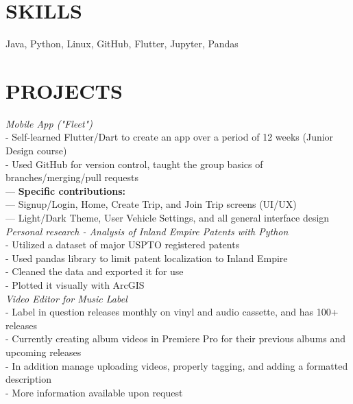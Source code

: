 \documentclass[line,margin]{res}
\begin{document}
\address{jonahbrawley@gmail.com}
\address{github.com/jonahbrawley}
\address{linkedin.com/in/jonahbrawley}
\begin{resume}

                    
\section{SKILLS}
                    Java, Python, Linux, GitHub, Flutter, Jupyter, Pandas

\section{PROJECTS}
                    {\sl Mobile App ("Fleet")}\\
                    - Self-learned Flutter/Dart to create an app over a period of 12 weeks (Junior Design course)\\
                    - Used GitHub for version control, taught the group basics of branches/merging/pull requests\\
                    --- {\bf Specific contributions:}\\
                    --- Signup/Login, Home, Create Trip, and Join Trip screens (UI/UX)\\
                    --- Light/Dark Theme, User Vehicle Settings, and all general interface design\\

                    {\sl Personal research - Analysis of Inland Empire Patents with Python} \\
                    - Utilized a dataset of major USPTO registered patents\\
                    - Used pandas library to limit patent localization to Inland Empire\\
                    - Cleaned the data and exported it for use\\
                    - Plotted it visually with ArcGIS\\

                    {\sl Video Editor for Music Label} \\
                    - Label in question releases monthly on vinyl and audio cassette, and has 100+ releases\\
                    - Currently creating album videos in Premiere Pro for their previous albums and upcoming releases\\
                    - In addition manage uploading videos, properly tagging, and adding a formatted description\\
                    - More information available upon request\\


\end{resume}
\end{document}
